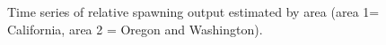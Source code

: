 \documentclass[
]{scrartcl}
\begin{document}
\begin{figure}


\caption{\label{fig-status-area}Time series of relative spawning output
estimated by area (area 1= California, area 2 = Oregon and Washington).}

\end{figure}%

\pagebreak



\newpage{}
\printnoidxglossaries
\end{document}
